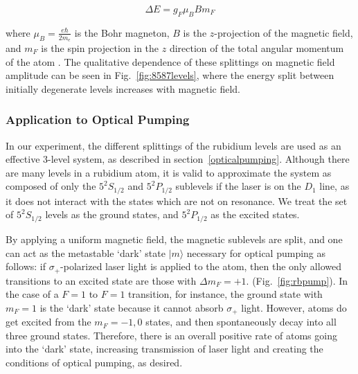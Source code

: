 \begin{equation}
\Delta E = g_F\mu_B B m_F
\label{eqn:zeeman}
\end{equation}

where $\mu_B = \frac{e\hbar}{2m_e}$ is the Bohr magneton, $B$ is the
$z$-projection of the magnetic field, and $m_F$ is the spin projection
in the $z$ direction of the total angular momentum of the atom
\cite{budker}. The qualitative dependence of these splittings on
magnetic field amplitude can be seen in Fig.~\ref{fig:8587levels},
where the energy split between initially degenerate levels increases
with magnetic field.

\subsubsection{Application to Optical Pumping}

In our experiment, the different splittings of the rubidium levels are
used as an effective 3-level system, as described in
section~\ref{opticalpumping}. Although there are many levels in a
rubidium atom, it is valid to approximate the system as composed of
only the $5^2S_{1/2}$ and $5^2P_{1/2}$ sublevels if the laser is on
the $D_1$ line, as it does not interact with the states which are not on
resonance. We treat the set of $5^2S_{1/2}$ levels as the ground
states, and $5^2P_{1/2}$ as the excited states. 

By applying a uniform magnetic field, the magnetic sublevels are
split, and one can act as the metastable `dark' state $|m\rangle$
necessary for optical pumping as follows: if $\sigma_+$-polarized
laser light is applied to the atom, then the only allowed transitions
to an excited state are those with $\Delta m_F = +1$.
(Fig.~\ref{fig:rbpump}). In the case of a $F = 1$ to $F = 1$
transition, for instance, the ground state with $m_F = 1$ is the
`dark' state because it cannot absorb $\sigma_+$ light. However, atoms
do get excited from the $m_F = -1, 0$ states, and then spontaneously
decay into all three ground states. Therefore, there is an overall
positive rate of atoms going into the `dark' state, increasing
transmission of laser light and creating the conditions of optical pumping, as desired. 

